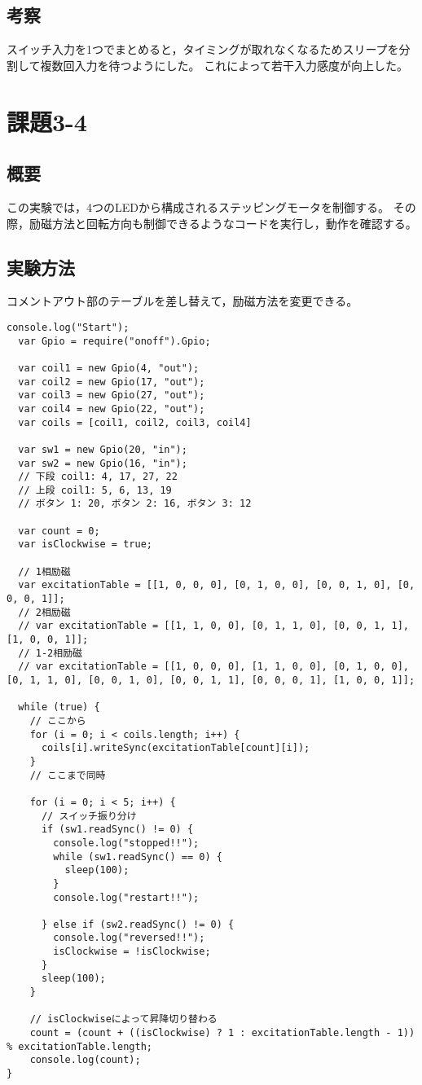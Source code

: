 \documentclass[a4paper,10pt]{jsarticle}
\begin{document}
\subsection{考察}
スイッチ入力を1つでまとめると，タイミングが取れなくなるためスリープを分割して複数回入力を待つようにした。
これによって若干入力感度が向上した。

\section{課題3-4}
\subsection{概要}
この実験では，4つのLEDから構成されるステッピングモータを制御する。
その際，励磁方法と回転方向も制御できるようなコードを実行し，動作を確認する。

\subsection{実験方法}
コメントアウト部のテーブルを差し替えて，励磁方法を変更できる。

\begin{lstlisting}[caption={program3-4},label={program3-4}]
  console.log("Start");
  var Gpio = require("onoff").Gpio;

  var coil1 = new Gpio(4, "out");
  var coil2 = new Gpio(17, "out");
  var coil3 = new Gpio(27, "out");
  var coil4 = new Gpio(22, "out");
  var coils = [coil1, coil2, coil3, coil4]

  var sw1 = new Gpio(20, "in");
  var sw2 = new Gpio(16, "in");
  // 下段 coil1: 4, 17, 27, 22
  // 上段 coil1: 5, 6, 13, 19
  // ボタン 1: 20, ボタン 2: 16, ボタン 3: 12

  var count = 0;
  var isClockwise = true;

  // 1相励磁
  var excitationTable = [[1, 0, 0, 0], [0, 1, 0, 0], [0, 0, 1, 0], [0, 0, 0, 1]];
  // 2相励磁
  // var excitationTable = [[1, 1, 0, 0], [0, 1, 1, 0], [0, 0, 1, 1], [1, 0, 0, 1]];
  // 1-2相励磁
  // var excitationTable = [[1, 0, 0, 0], [1, 1, 0, 0], [0, 1, 0, 0], [0, 1, 1, 0], [0, 0, 1, 0], [0, 0, 1, 1], [0, 0, 0, 1], [1, 0, 0, 1]];

  while (true) {
    // ここから
    for (i = 0; i < coils.length; i++) {
      coils[i].writeSync(excitationTable[count][i]);
    }
    // ここまで同時

    for (i = 0; i < 5; i++) {
      // スイッチ振り分け
      if (sw1.readSync() != 0) {
        console.log("stopped!!");
        while (sw1.readSync() == 0) {
          sleep(100);
        }
        console.log("restart!!");

      } else if (sw2.readSync() != 0) {
        console.log("reversed!!");
        isClockwise = !isClockwise;
      }
      sleep(100);
    }

    // isClockwiseによって昇降切り替わる
    count = (count + ((isClockwise) ? 1 : excitationTable.length - 1)) % excitationTable.length;
    console.log(count);
}

\end{lstlisting}
\end{document}
